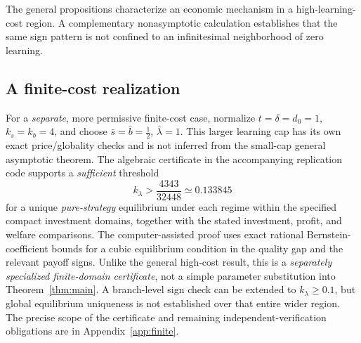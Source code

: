 \documentclass[11pt,a4paper]{article}
\numberwithin{equation}{section}
\theoremstyle{remark}
\newcommand{\kl}{k_{\lambda}}
\begin{document}
The general propositions characterize an economic mechanism in a high-learning-cost region. A complementary nonasymptotic calculation establishes that the same sign pattern is not confined to an infinitesimal neighborhood of zero learning.

\subsection{A finite-cost realization}

For a \emph{separate}, more permissive finite-cost case, normalize $t=\delta=d_0=1$, $k_s=k_b=4$, and choose $\bar s=\bar b=\frac12$, $\bar\lambda=1$. This larger learning cap has its own exact price/globality checks and is not inferred from the small-cap general asymptotic theorem. The algebraic certificate in the accompanying replication code supports a \emph{sufficient} threshold
\begin{equation}
 \kl>\frac{4343}{32448}\simeq 0.133845 \label{eq:threshold}
\end{equation}
for a unique \emph{pure-strategy} equilibrium under each regime within the specified compact investment domains, together with the stated investment, profit, and welfare comparisons. The computer-assisted proof uses exact rational Bernstein-coefficient bounds for a cubic equilibrium condition in the quality gap and the relevant payoff signs. Unlike the general high-cost result, this is a \emph{separately specialized finite-domain certificate}, not a simple parameter substitution into Theorem~\ref{thm:main}. A branch-level sign check can be extended to $\kl\ge0.1$, but global equilibrium uniqueness is not established over that entire wider region. The precise scope of the certificate and remaining independent-verification obligations are in Appendix~\ref{app:finite}.
\end{document}
